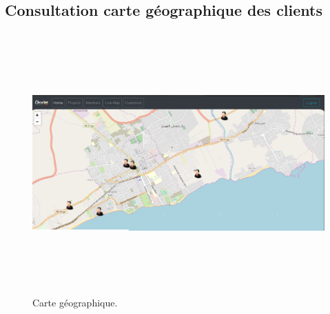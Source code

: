 \subsection{Consultation carte g\'{e}ographique des clients}

\FloatBarrier
\begin{figure}[H]
\center
\includegraphics[width=15cm,height=10cm]{./figures/pres/map.png}
\caption{Carte g\'{e}ographique.}
\end{figure}
\FloatBarrier
